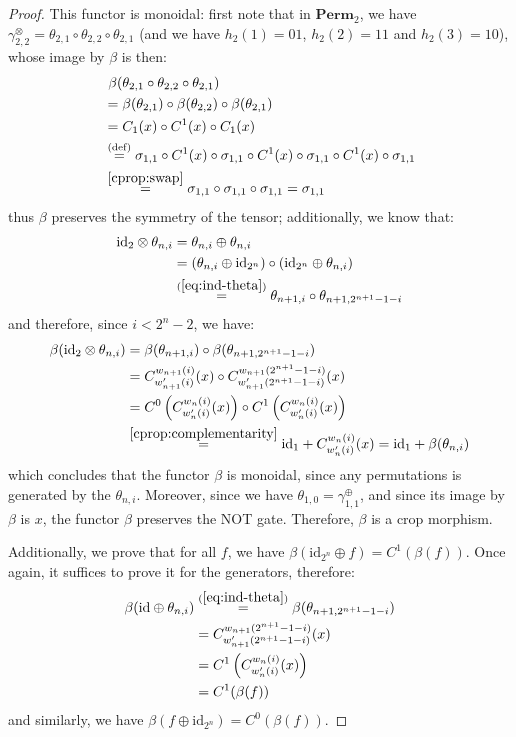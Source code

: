 \documentclass[a4paper]{article}
\theoremstyle{plain}
\theoremstyle{definition}
\newcommand{\cat}[1]{\mathbf{#1}}
\newcommand{\symtimes}{\gamma^\otimes}
\newcommand{\symplus}{\gamma^\oplus}
\newcommand{\iid}{\mathrm{id}}
\begin{document}
\begin{proof}
	This functor is monoidal: first note that in $\cat{Perm}_2$, we have
	$\symtimes_{2,2} = \theta_{2,1} \circ \theta_{2,2} \circ \theta_{2,1}$ (and we have
	$h_2(1) = 01$, $h_2(2) = 11$ and $h_2(3) = 10$), whose image by $\beta$ is then:
	\begin{align*}
		&\ \beta(\theta_{2,1} \circ \theta_{2,2} \circ \theta_{2,1}) \\
		&= \beta(\theta_{2,1}) \circ \beta(\theta_{2,2}) \circ \beta(\theta_{2,1}) \\
		&= C_1(x) \circ C^1(x) \circ C_1(x) \\
		&\stackrel{\text{(def)}}{=} \sigma_{1,1} \circ C^1(x) \circ \sigma_{1,1} \circ
		C^1(x) \circ \sigma_{1,1} \circ C^1(x) \circ \sigma_{1,1}
		\\
		&\stackrel{\ref{cprop:swap}}{=} \sigma_{1,1} \circ
		\sigma_{1,1} \circ \sigma_{1,1} = \sigma_{1,1}
	\end{align*}
	thus $\beta$ preserves the symmetry of the tensor; additionally, we know that:
	\begin{align*}
		\iid_2 \otimes \theta_{n,i}
		&= \theta_{n,i} \oplus \theta_{n,i} \\
		&= (\theta_{n,i} \oplus \iid_{2^n}) \circ (\iid_{2^n} \oplus \theta_{n,i}) \\
		&\stackrel{(\ref{eq:ind-theta})}{=} \theta_{n+1,i} \circ \theta_{n+1,2^{n+1}-1-i}
	\end{align*}
	and therefore, since $i < 2^n - 2$, we have:
	\begin{align*}
		\beta( \iid_2 \otimes \theta_{n,i})
		&= \beta(\theta_{n+1,i}) \circ \beta(\theta_{n+1,2^{n+1}-1-i}) \\
		&= C^{w_{n+1}(i)}_{w'_{n+1}(i)}(x) \circ C^{w_{n+1}(2^{n+1}-1-i)}_{w'_{n+1}(2^{n+1}-1-i)}(x) \\
		&= C^0 \left(C^{w_n(i)}_{w'_n(i)}(x) \right) \circ C^1 \left(C^{w_n(i)}_{w'_n(i)}(x) \right) \\
		&\stackrel{\ref{cprop:complementarity}}{=} \iid_1 +
		C^{w_n(i)}_{w'_n(i)}(x) = \iid_1 + \beta(\theta_{n,i})
	\end{align*}
	which concludes that the functor $\beta$ is monoidal, since any
	permutations is generated by the $\theta_{n,i}$. Moreover, since we have
	$\theta_{1,0} = \symplus_{1,1}$, and since its image by $\beta$ is $x$, the
	functor $\beta$ preserves the NOT gate. Therefore, $\beta$ is a crop
	morphism.

	Additionally, we prove that for all $f$, we have $\beta(\iid_{2^n}
	\oplus f) = C^1(\beta(f))$. Once again, it suffices to prove it for the
	generators, therefore:
	\begin{align*}
		\beta(\iid \oplus \theta_{n,i})
		&\stackrel{(\ref{eq:ind-theta})}{=} \beta(\theta_{n+1,2^{n+1}-1-i}) \\
		&= C^{w_{n+1}(2^{n+1}-1-i)}_{w'_{n+1}(2^{n+1}-1-i)}(x) \\
		&= C^1 \left(C^{w_n(i)}_{w'_n(i)}(x) \right) \\
		&= C^1(\beta(f))
	\end{align*}
	and similarly, we have $\beta(f \oplus \iid_{2^n}) = C^0(\beta(f))$.
\end{proof}
\end{document}
